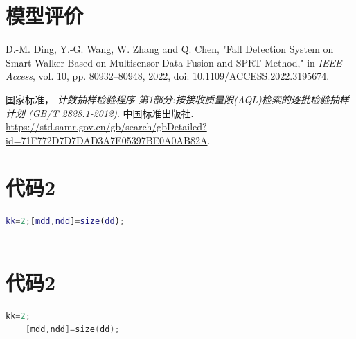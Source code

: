 \documentclass[withoutpreface,bwprint]{cumcmthesis} %
\begin{document}
\section{模型评价}

\begin{thebibliography}{9}%
	D.-M. Ding, Y.-G. Wang, W. Zhang and Q. Chen, "Fall Detection System on Smart Walker Based on Multisensor Data Fusion and SPRT Method," in 
	\emph{IEEE Access}, vol. 10, pp. 80932--80948, 2022, doi: 10.1109/ACCESS.2022.3195674.
	

	国家标准，
    \textit{计数抽样检验程序 第1部分:按接收质量限(AQL)检索的逐批检验抽样计划 (GB/T 2828.1-2012)}. 中国标准出版社. 
	\url{https://std.samr.gov.cn/gb/search/gbDetailed?id=71F772D7D7DAD3A7E05397BE0A0AB82A}.

	\bibitem[3]{}

	\bibitem[4]{}

	\bibitem[5]{}

\end{thebibliography}

\newpage
\begin{appendices}
	\section{代码2}

	\begin{lstlisting}[language=matlab]
	kk=2;[mdd,ndd]=size(dd);
	 
	 \end{lstlisting}

	\section{代码2}

	\begin{lstlisting}[language=c]
	kk=2;
	[mdd,ndd]=size(dd);
	 \end{lstlisting}
\end{appendices}
\end{document}
